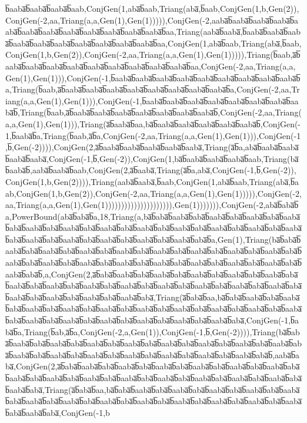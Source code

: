 b̅aaba̅b̅aaba̅b̅aaba̅b̅aab,ConjGen(1,aba̅b̅aab,Triang(aba̅,b̅aab,ConjGen(1,b,Gen(2)),ConjGen(-2,aa,Triang(a,a,Gen(1),Gen(1))))),ConjGen(-2,aaba̅b̅aaba̅b̅aaba̅b̅aaba̅b̅aaba̅b̅aaba̅b̅aaba̅b̅aaba̅b̅aaba̅b̅aaba̅b̅aaba̅b̅aaba̅b̅aa,Triang(aaba̅b̅aaba̅,b̅aaba̅b̅aaba̅b̅aaba̅b̅aaba̅b̅aaba̅b̅aaba̅b̅aaba̅b̅aaba̅b̅aaba̅b̅aaba̅b̅aa,ConjGen(1,aba̅b̅aab,Triang(aba̅,b̅aab,ConjGen(1,b,Gen(2)),ConjGen(-2,aa,Triang(a,a,Gen(1),Gen(1))))),Triang(b̅aab,a̅b̅aaba̅b̅aaba̅b̅aaba̅b̅aaba̅b̅aaba̅b̅aaba̅b̅aaba̅b̅aaba̅b̅aaba̅b̅aa,ConjGen(-2,aa,Triang(a,a,Gen(1),Gen(1))),ConjGen(-1,b̅aaba̅b̅aaba̅b̅aaba̅b̅aaba̅b̅aaba̅b̅aaba̅b̅aaba̅b̅aaba̅b̅aaba̅b̅a,Triang(b̅aab,a̅b̅aaba̅b̅aaba̅b̅aaba̅b̅aaba̅b̅aaba̅b̅aaba̅b̅aaba̅b̅aaba̅b̅a,ConjGen(-2,aa,Triang(a,a,Gen(1),Gen(1))),ConjGen(-1,b̅aaba̅b̅aaba̅b̅aaba̅b̅aaba̅b̅aaba̅b̅aaba̅b̅aaba̅b̅aaba̅b̅,Triang(b̅aab,a̅b̅aaba̅b̅aaba̅b̅aaba̅b̅aaba̅b̅aaba̅b̅aaba̅b̅aaba̅b̅,ConjGen(-2,aa,Triang(a,a,Gen(1),Gen(1))),Triang(a̅b̅aaba̅b̅aa,ba̅b̅aaba̅b̅aaba̅b̅aaba̅b̅aaba̅b̅aaba̅b̅,ConjGen(-1,b̅aaba̅b̅a,Triang(b̅aab,a̅b̅a,ConjGen(-2,aa,Triang(a,a,Gen(1),Gen(1))),ConjGen(-1,b̅,Gen(-2)))),ConjGen(2,a̅b̅aaba̅b̅aaba̅b̅aaba̅b̅aaba̅b̅aaba̅,Triang(a̅b̅a,aba̅b̅aaba̅b̅aaba̅b̅aaba̅b̅aaba̅,ConjGen(-1,b̅,Gen(-2)),ConjGen(1,ba̅b̅aaba̅b̅aaba̅b̅aaba̅b̅aab,Triang(ba̅b̅aaba̅b̅,aaba̅b̅aaba̅b̅aab,ConjGen(2,a̅b̅aaba̅,Triang(a̅b̅a,aba̅,ConjGen(-1,b̅,Gen(-2)),ConjGen(1,b,Gen(2)))),Triang(aaba̅b̅aaba̅,b̅aab,ConjGen(1,aba̅b̅aab,Triang(aba̅,b̅aab,ConjGen(1,b,Gen(2)),ConjGen(-2,aa,Triang(a,a,Gen(1),Gen(1))))),ConjGen(-2,aa,Triang(a,a,Gen(1),Gen(1))))))))))))))))))))),Gen(1))))))),ConjGen(-2,aba̅b̅aba̅b̅a,PowerBound(aba̅b̅aba̅b̅a,18,Triang(a,ba̅b̅aba̅b̅aaba̅b̅aba̅b̅aaba̅b̅aba̅b̅aaba̅b̅aba̅b̅aaba̅b̅aba̅b̅aaba̅b̅aba̅b̅aaba̅b̅aba̅b̅aaba̅b̅aba̅b̅aaba̅b̅aba̅b̅aaba̅b̅aba̅b̅aaba̅b̅aba̅b̅aaba̅b̅aba̅b̅aaba̅b̅aba̅b̅aaba̅b̅aba̅b̅aaba̅b̅aba̅b̅aaba̅b̅aba̅b̅aaba̅b̅aba̅b̅aaba̅b̅aba̅b̅a,Gen(1),Triang(ba̅b̅aba̅b̅aaba̅b̅aba̅b̅aaba̅b̅aba̅b̅aaba̅b̅aba̅b̅aaba̅b̅aba̅b̅aaba̅b̅aba̅b̅aaba̅b̅aba̅b̅aaba̅b̅aba̅b̅aaba̅b̅aba̅b̅aaba̅b̅aba̅b̅aaba̅b̅aba̅b̅aaba̅b̅aba̅b̅aaba̅b̅aba̅b̅aaba̅b̅aba̅b̅aaba̅b̅aba̅b̅aaba̅b̅aba̅b̅aaba̅b̅aba̅b̅aaba̅b̅aba̅b̅,a,ConjGen(2,a̅b̅aba̅b̅aaba̅b̅aba̅b̅aaba̅b̅aba̅b̅aaba̅b̅aba̅b̅aaba̅b̅aba̅b̅aaba̅b̅aba̅b̅aaba̅b̅aba̅b̅aaba̅b̅aba̅b̅aaba̅b̅aba̅b̅aaba̅b̅aba̅b̅aaba̅b̅aba̅b̅aaba̅b̅aba̅b̅aaba̅b̅aba̅b̅aaba̅b̅aba̅b̅aaba̅b̅aba̅b̅aaba̅b̅aba̅b̅aaba̅b̅aba̅b̅aaba̅b̅aba̅,Triang(a̅b̅aba̅b̅aa,ba̅b̅aba̅b̅aaba̅b̅aba̅b̅aaba̅b̅aba̅b̅aaba̅b̅aba̅b̅aaba̅b̅aba̅b̅aaba̅b̅aba̅b̅aaba̅b̅aba̅b̅aaba̅b̅aba̅b̅aaba̅b̅aba̅b̅aaba̅b̅aba̅b̅aaba̅b̅aba̅b̅aaba̅b̅aba̅b̅aaba̅b̅aba̅b̅aaba̅b̅aba̅b̅aaba̅b̅aba̅b̅aaba̅b̅aba̅b̅aaba̅b̅aba̅,ConjGen(-1,b̅aba̅b̅a,Triang(b̅ab,a̅b̅a,ConjGen(-2,a,Gen(1)),ConjGen(-1,b̅,Gen(-2)))),Triang(ba̅b̅aba̅b̅aaba̅b̅aba̅b̅aaba̅b̅aba̅b̅aaba̅b̅aba̅b̅aaba̅b̅aba̅b̅aaba̅b̅aba̅b̅aaba̅b̅aba̅b̅aaba̅b̅aba̅b̅aaba̅b̅aba̅b̅aaba̅b̅aba̅b̅aaba̅b̅aba̅b̅aaba̅b̅aba̅b̅aaba̅b̅aba̅b̅aaba̅b̅aba̅b̅aaba̅b̅aba̅b̅aaba̅b̅aba̅b̅,aaba̅b̅aba̅,ConjGen(2,a̅b̅aba̅b̅aaba̅b̅aba̅b̅aaba̅b̅aba̅b̅aaba̅b̅aba̅b̅aaba̅b̅aba̅b̅aaba̅b̅aba̅b̅aaba̅b̅aba̅b̅aaba̅b̅aba̅b̅aaba̅b̅aba̅b̅aaba̅b̅aba̅b̅aaba̅b̅aba̅b̅aaba̅b̅aba̅b̅aaba̅b̅aba̅b̅aaba̅b̅aba̅b̅aaba̅b̅aba̅b̅aaba̅b̅aba̅,Triang(a̅b̅aba̅b̅aa,ba̅b̅aba̅b̅aaba̅b̅aba̅b̅aaba̅b̅aba̅b̅aaba̅b̅aba̅b̅aaba̅b̅aba̅b̅aaba̅b̅aba̅b̅aaba̅b̅aba̅b̅aaba̅b̅aba̅b̅aaba̅b̅aba̅b̅aaba̅b̅aba̅b̅aaba̅b̅aba̅b̅aaba̅b̅aba̅b̅aaba̅b̅aba̅b̅aaba̅b̅aba̅b̅aaba̅b̅aba̅,ConjGen(-1,b
